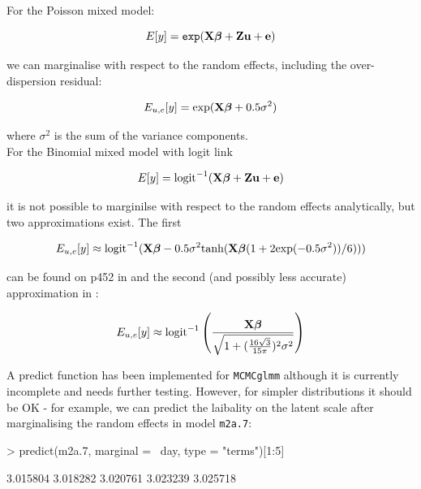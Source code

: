 \documentclass{article}
\begin{document}
For the Poisson mixed model:

\begin{equation}
E[y] = \texttt{exp}({\bf X}{\bm \beta}+{\bf Z}{\bf u}+{\bf e})
\end{equation}

we can marginalise with respect to the random effects, including the over-dispersion residual:

\begin{equation}
E_{{u,e}}[y] = \textrm{exp}({\bf X}{\bm \beta}+0.5\sigma^{2})
\end{equation}

where $\sigma^{2}$ is the sum of the variance components.\\

For the Binomial mixed model with logit link

\begin{equation}
E[y] = \textrm{logit}^{-1}({\bf X}{\bm \beta}+{\bf Z}{\bf u}+{\bf e})
\end{equation}

it is not possible to marginilse with respect to the random effects analytically, but two approximations exist. The first

\begin{equation}
E_{{u,e}}[y] \approx \textrm{logit}^{-1}({\bf X}{\bm \beta}-0.5\sigma^{2}\textrm{tanh}({\bf X}{\bm \beta}(1+2\textrm{exp}(-0.5\sigma^{2}))/6)))
\end{equation}

can be found on p452 in \citet{McCulloch.2001} and the second (and possibly less accurate) approximation in \citet{Diggle.2004}:


\begin{equation}
E_{{u,e}}[y] \approx \textrm{logit}^{-1}\left(\frac{{\bf X}{\bm \beta}}{\sqrt{1+(\frac{16\sqrt{3}}{15\pi})^{2}\sigma^{2}}}\right)
\end{equation}



A predict function has been implemented for \texttt{MCMCglmm} although it is currently incomplete and needs further testing. However, for simpler distributions it should be OK - for example, we can predict the laibality on the latent scale after marginalising the random effects in model \texttt{m2a.7}:

\begin{Schunk}
\begin{Sinput}
> predict(m2a.7, marginal = ~day, type = "terms")[1:5]
\end{Sinput}
\begin{Soutput}
[1] 3.015804 3.018282 3.020761 3.023239 3.025718
\end{Soutput}
\end{Schunk}
\end{document}
